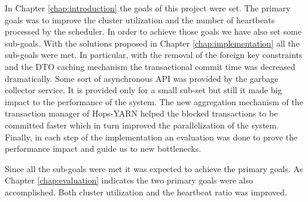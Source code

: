 In Chapter \ref{chap:introduction} the goals of this project were
set. The primary goals was to improve the cluster utilization and the
number of heartbeats processed by the scheduler. In order to achieve
those goals we have also set some sub-goals. With the solutions proposed
in Chapter \ref{chap:implementation} all the sub-goals were met. In
particular, with the removal of the foreign key constraints and the
DTO caching mechanism the transactional commit time was decreased
dramatically. Some sort of asynchronous API was provided by the
garbage collector service. It is provided only for a small sub-set but
still it made big impact to the performance of the system. The new
aggregation mechanism of the transaction manager of Hops-YARN helped
the blocked transactions to be committed faster which in turn improved the
parallelization of the system. Finally, in each step of the
implementation an evaluation was done to prove the performance impact
and guide us to new bottlenecks.

Since all the sub-goals were met it was expected to achieve the
primary goals. As Chapter \ref{chap:evaluation} indicates the two
primary goals were also accomplished. Both cluster utilization and the
heartbeat ratio was improved.
